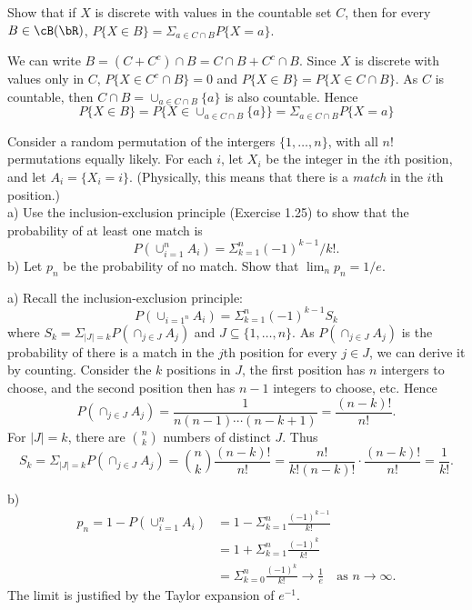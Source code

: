 \begin{exercise}
  Show that if $X$ is discrete with values in the countable set $C$, then for every $B\in\cB(\bR)$, $P\{X\in B\}=\Sigma_{a\in C\cap B}P\{X=a\}$.
\end{exercise}
\begin{solution}
  We can write $B=(C+C^c)\cap B=C\cap B+C^c\cap B$. Since $X$ is discrete with values only in $C$, $P\{X\in C^c\cap B\}=0$ and $P\{X\in B\} = P\{X\in C\cap B\}$. As $C$ is countable, then $C\cap B = \cup_{a\in C\cap B}\{a\}$ is also countable. Hence
  \[ P\{X\in B\} = P\{X\in\cup_{a\in C\cap B}\{a\}\} = \Sigma_{a\in C\cap B}P\{X=a\} \]
\end{solution}


\begin{exercise}
  Consider a random permutation of the intergers $\{1,\ldots,n\}$, with all $n!$ permutations equally likely. For each $i$, let $X_i$ be the integer in the $i$th position, and let $A_i=\{X_i=i\}$. (Physically, this means that there is a \textit{match} in the $i$th position.) \\
  a) Use the inclusion-exclusion principle (Exercise 1.25) to show that the probability of at least one match is
  \[ P(\cup_{i=1}^nA_i) = \Sigma_{k=1}^n (-1)^{k-1}/k!. \]
  b) Let $p_n$ be the probability of no match. Show that $\lim_n p_n=1/e$.
\end{exercise}
\begin{solution}
  a) Recall the inclusion-exclusion principle:
  \[ P(\cup_{i=1^n}A_i) = \Sigma_{k=1}^n(-1)^{k-1}S_k \]
  where $S_k = \Sigma_{|J|=k} P(\cap_{j\in J}A_j)$ and $J\subseteq\{1,\ldots,n\}$. As $P(\cap_{j\in J}A_j)$ is the probability of there is a match in the $j$th position for every $j\in J$, we can derive it by counting. Consider the $k$ positions in $J$, the first position has $n$ intergers to choose, and the second position then has $n-1$ integers to choose, etc. Hence
  \[ P(\cap_{j\in J}A_j) = \frac{1}{n(n-1)\cdots(n-k+1)} = \frac{(n-k)!}{n!} .\]
  For $|J|=k$, there are $\binom{n}{k}$ numbers of distinct $J$. Thus
  \[ S_k = \Sigma_{|J|=k}P(\cap_{j\in J}A_j) = \binom{n}{k}\frac{(n-k)!}{n!} = \frac{n!}{k!(n-k)!}\cdot\frac{(n-k)!}{n!} = \frac{1}{k!} .\]

  b)\begin{align*}
    p_n = 1 - P(\cup_{i=1}^n A_i) &= 1 - \Sigma_{k=1}^n\frac{(-1)^{k-1}}{k!} \\
      &= 1 + \Sigma_{k=1}^n\frac{(-1)^{k}}{k!} \\
      &= \Sigma_{k=0}^n\frac{(-1)^{k}}{k!} \to \frac{1}{e} \quad\mbox{as $n\to\infty$} .
  \end{align*}
  The limit is justified by the Taylor expansion of $e^{-1}$.
\end{solution}


